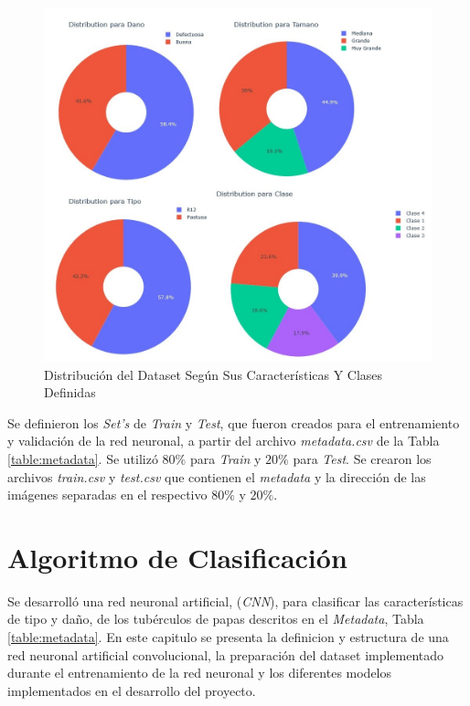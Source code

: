 \begin{figure}[ht]
	\centering
	\includegraphics[scale=0.4]{Figs/Distribucion.jpg}
	\caption{Distribución del Dataset Según Sus Características Y Clases Definidas}
	\label{fig:distribuciontipo}
\end{figure}

Se definieron los \textit{Set's} de \textit{Train} y \textit{Test}, que fueron creados para el entrenamiento y validación de la red neuronal, a partir del archivo \textit{metadata.csv} de la Tabla \ref{table:metadata}. Se utilizó $80\%$ para \textit{Train} y $20\%$ para \textit{Test}. Se crearon los archivos \textit{train.csv} y \textit{test.csv} que contienen el \textit{metadata} y la dirección de las imágenes separadas en el respectivo $80\%$ y $20\%$.



\chapter{Algoritmo de Clasificación}

Se desarrolló una red neuronal artificial, (\textit{CNN}), para clasificar las características de tipo y daño, de los tubérculos de papas descritos en el \textit{Metadata}, Tabla \ref{table:metadata}. En este capitulo se presenta la definicion y estructura de una red neuronal artificial convolucional, la preparación del dataset implementado durante el entrenamiento de la red neuronal y los diferentes modelos implementados en el desarrollo del proyecto.

